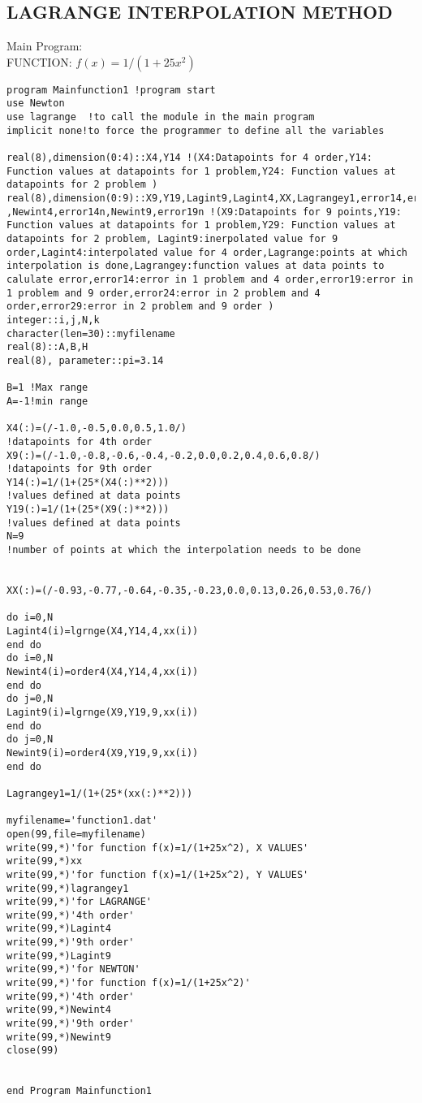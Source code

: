 \documentclass[10pt,a4paper]{article}
\begin{document}
\subsection{LAGRANGE INTERPOLATION METHOD}
Main Program:\\
FUNCTION: $f(x)=1/(1+25x^2)$
\begin{lstlisting}
program Mainfunction1 !program start
use Newton
use lagrange  !to call the module in the main program
implicit none!to force the programmer to define all the variables

real(8),dimension(0:4)::X4,Y14 !(X4:Datapoints for 4 order,Y14: Function values at datapoints for 1 problem,Y24: Function values at datapoints for 2 problem )
real(8),dimension(0:9)::X9,Y19,Lagint9,Lagint4,XX,Lagrangey1,error14,error19&
,Newint4,error14n,Newint9,error19n !(X9:Datapoints for 9 points,Y19: Function values at datapoints for 1 problem,Y29: Function values at datapoints for 2 problem, Lagint9:inerpolated value for 9 order,Lagint4:interpolated value for 4 order,Lagrange:points at which interpolation is done,Lagrangey:function values at data points to calulate error,error14:error in 1 problem and 4 order,error19:error in 1 problem and 9 order,error24:error in 2 problem and 4 order,error29:error in 2 problem and 9 order )
integer::i,j,N,k
character(len=30)::myfilename
real(8)::A,B,H
real(8), parameter::pi=3.14

B=1 !Max range
A=-1!min range

X4(:)=(/-1.0,-0.5,0.0,0.5,1.0/)                                              !datapoints for 4th order
X9(:)=(/-1.0,-0.8,-0.6,-0.4,-0.2,0.0,0.2,0.4,0.6,0.8/)                       !datapoints for 9th order
Y14(:)=1/(1+(25*(X4(:)**2)))                                                 !values defined at data points
Y19(:)=1/(1+(25*(X9(:)**2)))                                                 !values defined at data points
N=9                                                                          !number of points at which the interpolation needs to be done


XX(:)=(/-0.93,-0.77,-0.64,-0.35,-0.23,0.0,0.13,0.26,0.53,0.76/)

do i=0,N
Lagint4(i)=lgrnge(X4,Y14,4,xx(i))
end do
do i=0,N
Newint4(i)=order4(X4,Y14,4,xx(i))
end do
do j=0,N
Lagint9(i)=lgrnge(X9,Y19,9,xx(i))
end do
do j=0,N
Newint9(i)=order4(X9,Y19,9,xx(i))
end do

Lagrangey1=1/(1+(25*(xx(:)**2)))

myfilename='function1.dat'
open(99,file=myfilename)
write(99,*)'for function f(x)=1/(1+25x^2), X VALUES'
write(99,*)xx
write(99,*)'for function f(x)=1/(1+25x^2), Y VALUES'
write(99,*)lagrangey1
write(99,*)'for LAGRANGE'
write(99,*)'4th order'
write(99,*)Lagint4
write(99,*)'9th order'
write(99,*)Lagint9
write(99,*)'for NEWTON'
write(99,*)'for function f(x)=1/(1+25x^2)'
write(99,*)'4th order'
write(99,*)Newint4
write(99,*)'9th order'
write(99,*)Newint9
close(99)


end Program Mainfunction1

	\end{lstlisting}
\end{document}
